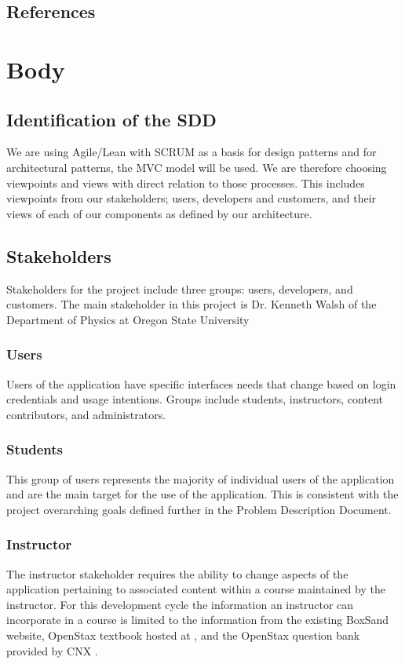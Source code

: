 \documentclass[onecolumn, draftclsnofoot,10pt, compsoc]{IEEEtran}
\begin{document}
\subsection{References}
  
 

\section{Body}
\subsection{Identification of the SDD}
We are using Agile/Lean with SCRUM as a basis for design patterns and for architectural patterns, the MVC model will be used. We are therefore choosing viewpoints and views with direct relation to those processes. This includes viewpoints from our stakeholders; users, developers and customers, and their views of each of our components as defined by our architecture.

\subsection{Stakeholders}
Stakeholders for the project include three groups: users, developers, and customers. The main stakeholder in this project is Dr. Kenneth Walsh of the Department of Physics at Oregon State University

\subsubsection{Users}
Users of the application have specific interfaces needs that change based on login credentials and usage intentions. Groups include students, instructors, content contributors, and administrators.

\subsubsection*{Students}
This group of users represents the majority of individual users of the application and are the main target for the use of the application. This is consistent with the project overarching goals defined further in the Problem Description Document. 

\subsubsection*{Instructor}
The instructor stakeholder requires the ability to change aspects of the application pertaining to associated content within a course maintained by the instructor. For this development cycle the information an instructor can incorporate in a course is limited to the information from the existing BoxSand website, OpenStax textbook hosted at \cite{openstax-book}, and the OpenStax question bank provided by CNX \cite{quadbase}.
\end{document}
